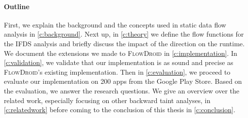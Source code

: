 \documentclass[../draft.tex]{subfiles}
\begin{document}
    \paragraph{Outline}
    First, we explain the background and the concepts used in static data flow analysis in \autoref{c:background}.
    Next up, in \autoref{c:theory} we define the flow functions for the IFDS analysis and briefly discuss the impact of the direction on the runtime.
    We document the extensions we made to \textsc{FlowDroid} in \autoref{c:implementation}.
    In \autoref{c:validation}, we validate that our implementation is as sound and precise as \textsc{FlowDroid}'s existing implementation.
    Then in \autoref{c:evaluation}, we proceed to evaluate our implementation on 200 apps from the Google Play Store. Based on the evaluation, we answer the research questions.
    We give an overview over the related work, especially focusing on other backward taint analyses, in \autoref{c:relatedwork} before coming to the conclusion of this thesis in \autoref{c:conclusion}.
\end{document}

